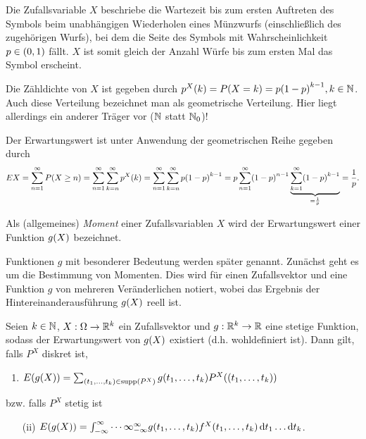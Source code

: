 \documentclass{lecture}
\begin{document}
    \begin{example}
        Die Zufallsvariable \(X\) beschriebe die Wartezeit bis zum ersten Auftreten des Symbols beim unabhängigen Wiederholen eines Münzwurfs (einschließlich des zugehörigen Wurfs), bei dem die Seite des Symbols mit Wahrscheinlichkeit \(p \in \parentheses*{0, 1}\) fällt.
        \(X\) ist somit gleich der Anzahl Würfe bis zum ersten Mal das Symbol erscheint.
        
        Die Zähldichte von \(X\) ist gegeben durch \(p^X\parentheses*{k} = P\parentheses*{X = k} = p\parentheses*{1 - p}^{k - 1}, k \in \N\).
        Auch diese Verteilung bezeichnet man als geometrische Verteilung.
        Hier liegt allerdings ein anderer Träger vor (\(\N\) statt \(\N_0\))!
        
        Der Erwartungswert ist unter Anwendung der geometrischen Reihe gegeben durch
        \[
            EX = \sum_{n = 1}^\infty P\parentheses*{X \ge n} = \sum_{n = 1}^\infty \sum_{k = n}^\infty p^X\parentheses*{k} = \sum_{n = 1}^\infty \sum_{k = n}^\infty p\parentheses*{1 - p}^{k - 1} = p\sum_{n = 1}^\infty \parentheses*{1 - p}^{n - 1}\underbrace{\sum_{k = 1}^\infty \parentheses*{1 - p}^{k - 1}}_{= \frac{1}{p}} = \frac{1}{p}.
        \]
    \end{example}
    
    \begin{definition}
        Als (allgemeines) \emph{Moment} einer Zufallsvariablen \(X\) wird der Erwartungswert einer Funktion \(g\parentheses*{X}\) bezeichnet.
    \end{definition}
    
    Funktionen \(g\) mit besonderer Bedeutung werden später genannt.
    Zunächst geht es um die Bestimmung von Momenten.
    Dies wird für einen Zufallsvektor und eine Funktion \(g\) von mehreren Veränderlichen notiert, wobei das Ergebnis der Hintereinanderausführung \(g\parentheses*{X}\) reell ist.
    
    \begin{theorem}
        Seien \(k \in \N\), \(X: \Omega \to \R^k\) ein Zufallsvektor und \(g: \R^k \to \R\) eine stetige Funktion, sodass der Erwartungswert von \(g\parentheses*{X}\) existiert (d.h. wohldefiniert ist).
        Dann gilt, falls \(P^X\) diskret ist,
        \begin{enumerate}
            \item \(E\parentheses*{g\parentheses*{X}} = \sum_{\parentheses*{t_1, \ldots, t_k} \in \supp\parentheses*{P^X}}g\parentheses*{t_1, \ldots, t_k}P^X\parentheses*{\parentheses*{t_1, \ldots, t_k}}\)
        \end{enumerate}
        bzw. falls \(P^X\) stetig ist
        \begin{enumerate}
            \item[(ii)] \(E\parentheses*{g\parentheses*{X}} = \int_{-\infty}^\infty \cdots \infty_{-\infty}^\infty g\parentheses*{t_1, \ldots, t_k}f^X\parentheses*{t_1, \ldots, t_k}\d t_1 \ldots \d t_k\).
        \end{enumerate}
    \end{theorem}
    
\end{document}
